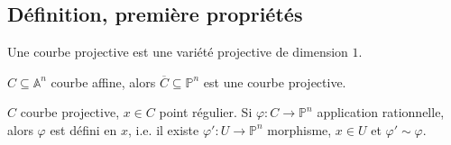         \subsection{Définition, première propriétés}
            \begin{defi}
                Une courbe projective est une variété projective de dimension $1$.
            \end{defi}
            \begin{expl}
                $C \subseteq \mathbb{A}^n$ courbe affine, alors $\overline{C} \subseteq \mathbb{P}^n$ est une courbe projective.
            \end{expl}
            \begin{prop}
                $C$ courbe projective, $x \in C$ point régulier. Si $\varphi : C \to \mathbb{P}^n$ application rationnelle, alors $\varphi$ est défini en $x$, i.e. il existe $\varphi' : U \to \mathbb{P}^n$ morphisme, $x \in U$ et $\varphi' \sim \varphi$.
            \end{prop}
